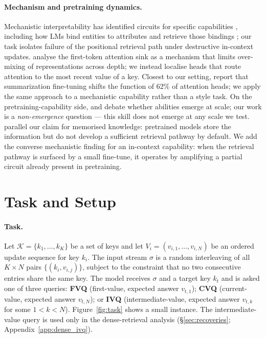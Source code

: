 \documentclass[11pt]{article}
\begin{document}
\paragraph{Mechanism and pretraining dynamics.}
Mechanistic interpretability has identified circuits for specific
capabilities \citep{olsson2022induction, wang2022ioi, conmy2023acdc,
li2025state}, including how LMs bind entities to attributes and
retrieve those bindings \citep{feng2024binding, gurarieh2025mixing};
our task isolates failure of the positional retrieval path under
destructive in-context updates.
\citet{barbero2025firsttoken} analyse the first-token attention sink
as a mechanism that limits over-mixing of representations across
depth; we instead localise heads that route attention to the most
recent value of a key. Closest to our setting, \citet{mishra2025summarization} report that
summarization fine-tuning shifts the function of 62\% of attention
heads; we apply the same approach to a mechanistic capability
rather than a style task.
On the pretraining-capability side, \citet{wei2022emergent} and
\citet{schaeffer2023mirage} debate whether abilities emerge at
scale; our work is a \emph{non-emergence} question --- this skill
does not emerge at any scale we test. \citet{allenzhu2024knowledge}
parallel our claim for memorised knowledge: pretrained models store
the information but do not develop a sufficient retrieval pathway
by default. We add the converse mechanistic finding for an
in-context capability: when the retrieval pathway is surfaced by a
small fine-tune, it operates by amplifying a partial circuit
already present in pretraining.

\section{Task and Setup}
\label{sec:setup}

\paragraph{Task.}
Let $\mathcal{K} = \{k_1, \ldots, k_K\}$ be a set of keys and let
$V_i = (v_{i,1}, \ldots, v_{i,N})$ be an ordered update sequence for
key $k_i$.
The input stream $\sigma$ is a random interleaving of all
$K \times N$ pairs $\{(k_i, v_{i,j})\}$, subject to the constraint
that no two consecutive entries share the same key.
The model receives $\sigma$ and a target key $k_t$ and is asked one
of three queries: \textbf{FVQ} (first-value, expected answer
$v_{t,1}$); \textbf{CVQ} (current-value, expected answer $v_{t,N}$);
or \textbf{IVQ} (intermediate-value, expected answer $v_{t,k}$ for
some $1 < k < N$).
Figure~\ref{fig:task} shows a small instance. The intermediate-value
query is used only in the dense-retrieval analysis
(\S\ref{sec:recoveries}; Appendix~\ref{app:dense_ivq}).
\end{document}
